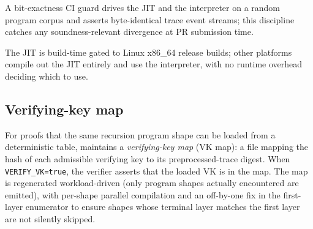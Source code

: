 A bit-exactness CI guard drives the JIT and the interpreter on a random program corpus and asserts byte-identical trace event streams; this discipline catches any soundness-relevant divergence at PR submission time.

The JIT is build-time gated to Linux x86\_64 release builds; other platforms compile out the JIT entirely and use the interpreter, with no runtime overhead deciding which to use.

\subsection{Verifying-key map}

For proofs that the same recursion program shape can be loaded from a deterministic table, \Zirenver{} maintains a \emph{verifying-key map} (VK map): a file mapping the hash of each admissible verifying key to its preprocessed-trace digest. When \texttt{VERIFY\_VK=true}, the verifier asserts that the loaded VK is in the map. The map is regenerated workload-driven (only program shapes actually encountered are emitted), with per-shape parallel compilation and an off-by-one fix in the first-layer enumerator to ensure shapes whose terminal layer matches the first layer are not silently skipped.
